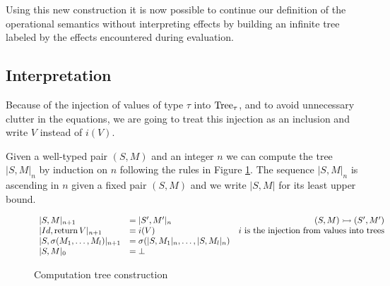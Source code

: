 Using this new construction it is now possible  
to continue our definition of the operational semantics without 
interpreting effects by building an infinite tree
labeled by the effects encountered during evaluation.

\subsection{Interpretation}

Because of the injection of values of type $\tau$ into $\textnormal{Tree}_\tau$,
and to avoid unnecessary clutter in the equations, we are going to treat 
this injection as an inclusion and write $V$ instead of $i(V)$.


\begin{adefinition}
    Given a well-typed pair $(S,M)$ and an integer $n$ we can 
    compute the tree $|S,M|_n$ by induction on $n$ 
    following the rules in Figure \ref{fig:treecalcul}.
    The sequence $|S,M|_n$ is ascending in $n$ given a fixed 
    pair $(S,M)$ and we write $|S,M|$ for its least upper bound.
\end{adefinition}

\begin{figure}[h!]
    \begin{center}
        \begin{equation*}
            \begin{array}{llr}
                |S,M|_{n+1} &= |S',M'|_n & (S,M) \rightarrowtail (S',M') \\
                |Id,\operatorname{return} V|_{n+1} &= i(V) & i \text{ is the injection from values into
                trees} \\
                |S,\sigma(M_1, \dots, M_l)|_{n+1} &= \sigma (|S, M_1|_n, \dots,|S,M_l|_n) \\
                |S,M|_0 &= \bot \\
            \end{array}
        \end{equation*}
    \end{center}
    \caption{Computation tree construction}
    \label{fig:treecalcul}
\end{figure}


